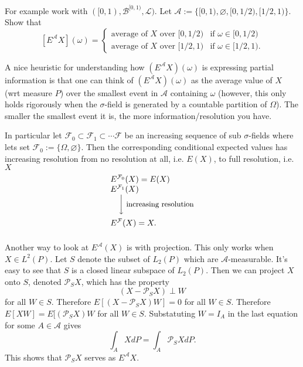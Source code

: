 \begin{example} For example work with $([0,1), \mathcal B^{[0,1)}, \mathcal L)$. Let $\mathcal A :=\{[0,1), \varnothing, [0,1/2), [1/2,1) \}$. Show that
\[
[E^{\mathcal A}X](\omega) = \begin{cases}
\text{average of $X$ over $[0,1/2)$} & \text{if $\omega\in [0,1/2)$} \\
\text{average of $X$ over $[1/2,1)$} & \text{if $\omega\in [1/2,1)$}.
\end{cases}
\]
\end{example}

\begin{example}
A nice heuristic for understanding how $\left(E^{\mathcal A}X\right)(\omega)$ is expressing partial information is that one can think of $\left(E^{\mathcal A}X\right)(\omega)$ as the average value of $X$ (wrt measure $P$) over the smallest event in $\mathcal A$ containing $\omega$ (however, this only holds rigorously when the $\sigma$-field is generated by a countable partition of $\Omega$). The smaller the smallest event it is, the more information/resolution you have.

In particular let  $\mathcal F_0 \subset \mathcal F_1 \subset \cdots \mathcal F$ be an increasing sequence of sub $\sigma$-fields where lets set $\mathcal F_0:= \{\Omega, \varnothing  \}$.
 Then the corresponding conditional expected values has increasing resolution from no resolution at all, i.e. $E(X)$, to full resolution, i.e. $X$
\[
\begin{array}{l}
E^{\mathcal F_0}(X) = E(X) \\
E^{\mathcal F_1}(X) \\
\quad\left\downarrow\vphantom{\displaystyle\int}\right.\text{\small increasing resolution} \\
E^{\mathcal F}(X) = X.\vphantom{\displaystyle\int}\\
\end{array}
\]
\end{example}

\begin{example}
Another way to look at $E^{\mathcal A}(X)$ is with projection. This only works when $X\in L^2(P)$. Let $S$ denote the subset of $L_2(P)$ which are $\mathcal A$-measurable. It's easy to see that $S$ is a closed linear subspace of $L_2(P)$. Then we can project $X$ onto $S$, denoted $\mathcal P_SX$, which has the property
\[
(X - \mathcal P_SX) \perp W
\]
for all $W\in S$. Therefore $E[(X - \mathcal P_SX)W]=0$ for all $W\in S$. Therefore $E[XW]=E[(\mathcal P_SX)W$ for all $W\in S$. Substatuting $W= I_A$ in the last equation for some $A\in \mathcal A$ gives
\[
\int_A X dP = \int_A \mathcal P_SX dP.
\]
This shows that $\mathcal P_SX$ serves as $E^{\mathcal A}X$.
\end{example}



